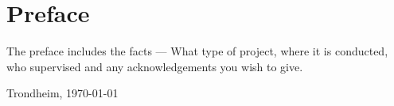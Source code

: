 \chapter*{Preface}
\vspace{1cm}
The preface includes the facts --- What type of project, where it is conducted, who supervised and any acknowledgements you wish to give. 
\vfill
\begin{flushright}
    \thesisAuthor\par
    Trondheim, \today
\end{flushright}